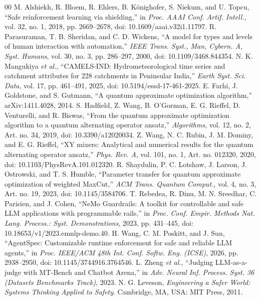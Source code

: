 \documentclass[conference]{IEEEtran}
\begin{document}
\begin{thebibliography}{00}
 M. Alshiekh, R. Bloem, R. Ehlers, B. K\"{o}nighofer, S. Niekum, and U. Topcu, ``Safe reinforcement learning via shielding,'' in \textit{Proc. AAAI Conf. Artif. Intell.}, vol. 32, no. 1, 2018, pp. 2669--2678, doi: 10.1609/aaai.v32i1.11797.
 R. Parasuraman, T. B. Sheridan, and C. D. Wickens, ``A model for types and levels of human interaction with automation,'' \textit{IEEE Trans. Syst., Man, Cybern. A, Syst. Humans}, vol. 30, no. 3, pp. 286--297, 2000, doi: 10.1109/3468.844354.
 N. K. Mangukiya \textit{et al.}, ``CAMELS-IND: Hydrometeorological time series and catchment attributes for 228 catchments in Peninsular India,'' \textit{Earth Syst. Sci. Data}, vol. 17, pp. 461--491, 2025, doi: 10.5194/essd-17-461-2025.
 E. Farhi, J. Goldstone, and S. Gutmann, ``A quantum approximate optimization algorithm,'' arXiv:1411.4028, 2014.
 S. Hadfield, Z. Wang, B. O'Gorman, E. G. Rieffel, D. Venturelli, and R. Biswas, ``From the quantum approximate optimization algorithm to a quantum alternating operator ansatz,'' \textit{Algorithms}, vol. 12, no. 2, Art. no. 34, 2019, doi: 10.3390/a12020034.
 Z. Wang, N. C. Rubin, J. M. Dominy, and E. G. Rieffel, ``XY mixers: Analytical and numerical results for the quantum alternating operator ansatz,'' \textit{Phys. Rev. A}, vol. 101, no. 1, Art. no. 012320, 2020, doi: 10.1103/PhysRevA.101.012320.
 R. Shaydulin, P. C. Lotshaw, J. Larson, J. Ostrowski, and T. S. Humble, ``Parameter transfer for quantum approximate optimization of weighted MaxCut,'' \textit{ACM Trans. Quantum Comput.}, vol. 4, no. 3, Art. no. 19, 2023, doi: 10.1145/3584706.
 T. Rebedea, R. Dinu, M. N. Sreedhar, C. Parisien, and J. Cohen, ``NeMo Guardrails: A toolkit for controllable and safe LLM applications with programmable rails,'' in \textit{Proc. Conf. Empir. Methods Nat. Lang. Process.: Syst. Demonstrations}, 2023, pp. 431--445, doi: 10.18653/v1/2023.emnlp-demo.40.
 H. Wang, C. M. Poskitt, and J. Sun, ``AgentSpec: Customizable runtime enforcement for safe and reliable LLM agents,'' in \textit{Proc. IEEE/ACM 48th Int. Conf. Softw. Eng. (ICSE)}, 2026, pp. 2938--2950, doi: 10.1145/3744916.3764546.
 L. Zheng \textit{et al.}, ``Judging LLM-as-a-judge with MT-Bench and Chatbot Arena,'' in \textit{Adv. Neural Inf. Process. Syst. 36 (Datasets Benchmarks Track)}, 2023.
 N. G. Leveson, \textit{Engineering a Safer World: Systems Thinking Applied to Safety}. Cambridge, MA, USA: MIT Press, 2011.

\end{thebibliography}
\end{document}
